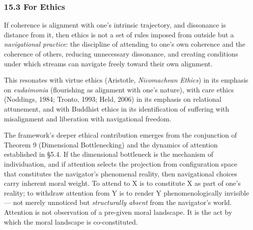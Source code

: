 \subsubsection*{15.3 For Ethics}


If coherence is alignment with one's intrinsic trajectory, and dissonance is distance from it, then ethics is not a set of rules imposed from outside but a \textit{navigational practice}: the discipline of attending to one's own coherence and the coherence of others, reducing unnecessary dissonance, and creating conditions under which streams can navigate freely toward their own alignment.


This resonates with virtue ethics (Aristotle, \textit{Nicomachean Ethics}) in its emphasis on \textit{eudaimonia} (flourishing as alignment with one's nature), with care ethics (Noddings, 1984; Tronto, 1993; Held, 2006) in its emphasis on relational attunement, and with Buddhist ethics in its identification of suffering with misalignment and liberation with navigational freedom.


The framework's deeper ethical contribution emerges from the conjunction of Theorem 9 (Dimensional Bottlenecking) and the dynamics of attention established in §5.4. If the dimensional bottleneck is the mechanism of individuation, and if attention selects the projection from configuration space that constitutes the navigator's phenomenal reality, then navigational choices carry inherent moral weight. To attend to X is to constitute X as part of one's reality; to withdraw attention from Y is to render Y phenomenologically invisible — not merely unnoticed but \textit{structurally absent} from the navigator's world. Attention is not observation of a pre-given moral landscape. It is the act by which the moral landscape is co-constituted.


